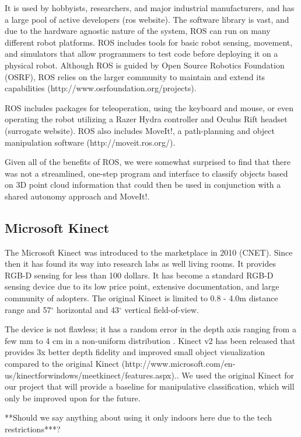 \documentclass{article}
\begin{document}
It is used by hobbyists, researchers, and major industrial manufacturers, and has a large pool of active developers (ros website). The software library is vast, and due to the hardware agnostic nature of the system, ROS can run on many different robot platforms.  ROS includes tools for basic robot sensing, movement, and simulators that allow programmers to test code before deploying it on a physical robot. Although ROS is guided by Open Source Robotics Foundation (OSRF), ROS relies on the larger community to maintain and extend its capabilities (http://www.osrfoundation.org/projects).

ROS includes packages for teleoperation, using the keyboard and mouse, or even operating the robot utilizing a Razer Hydra controller and Oculus Rift headset (surrogate website). ROS also includes MoveIt!, a path-planning and object manipulation software (http://moveit.ros.org/). 

Given all of the benefits of ROS, we were somewhat surprised to find that there was not a streamlined, one-step program and interface to classify objects based on 3D point cloud information that could then be used in conjunction with a shared autonomy approach and MoveIt!.

\subsection{Microsoft Kinect}
The Microsoft Kinect was introduced to the marketplace in 2010 (CNET). Since then 
it has found its way into research labs as well living rooms.
It provides RGB-D sensing for less than 100 dollars. It has become a standard RGB-D
sensing device due to its low price point, extensive documentation, and large community of
adopters. The original Kinect is limited to 0.8 - 4.0m distance range and 57$^{\circ}$ horizontal 
and 43$^{\circ}$ vertical field-of-view. 

The device is not flawless; it has a random error in the depth axis 
ranging from a few mm to 4 cm in a non-uniform distribution \cite{khoshelham2012accuracy,nguyen2012modeling}.
Kinect v2 has been released that provides 3x better depth fidelity and improved small object visualization compared to 
the original Kinect (http://www.microsoft.com/en-us/kinectforwindows/meetkinect/features.aspx).. We used the original Kinect for our project that will provide a baseline for manipulative classification, which will only be improved upon for the future.

**Should we say anything about using it only indoors here due to the tech restrictions***?
\end{document}
